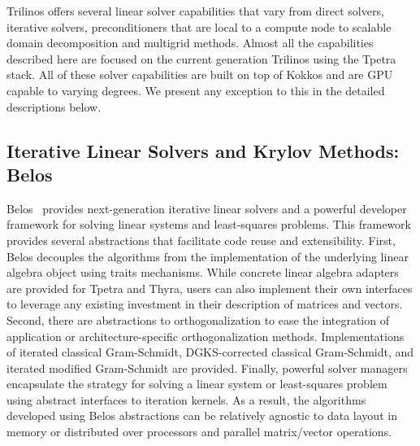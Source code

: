 %

Trilinos offers several linear solver capabilities that vary from direct solvers, iterative solvers, preconditioners that are local to a compute node to scalable domain decomposition and multigrid methods. Almost all the capabilities described here are focused on the current generation Trilinos using the Tpetra stack. All of these solver capabilities are built on top of Kokkos and are GPU capable to varying degrees. We present any exception to this in the detailed descriptions below.

\subsection{Iterative Linear Solvers and Krylov Methods: Belos}

Belos~\cite{Bavier2012a} provides next-generation iterative linear solvers and 
a powerful developer framework for solving linear systems and least-squares problems.
This framework provides several abstractions that facilitate code reuse and extensibility.
First, Belos decouples the algorithms from the implementation of the underlying linear
algebra object using traits mechanisms.  While concrete linear algebra adapters are provided
for Tpetra and Thyra, users can also implement their own interfaces to leverage any
existing investment in their description of matrices and vectors.  Second, there are abstractions
to orthogonalization to ease the integration of application or architecture-specific orthogonalization
methods. Implementations of iterated classical Gram-Schmidt, DGKS-corrected classical Gram-Schmidt,
and iterated modified Gram-Schmidt are provided.  Finally, powerful solver managers encapsulate the 
strategy for solving a linear system or least-squares problem using abstract interfaces to iteration 
kernels.  As a result, the algorithms developed using Belos abstractions can be relatively agnostic
to data layout in memory or distributed over processors and parallel matrix/vector operations.

